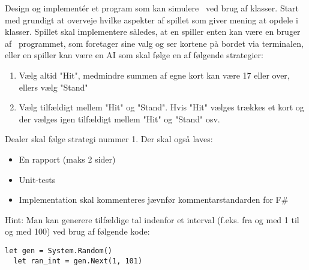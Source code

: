 Design og implement\'{e}r et program som kan simulere \sbl\ ved brug af klasser.  Start med grundigt at overveje hvilke aspekter af spillet som giver mening at opdele i klasser. Spillet skal implementere således, at en spiller enten kan være en bruger af \sbl\ programmet, som foretager sine valg og ser kortene på bordet via terminalen, eller en spiller kan være en AI som skal følge en af følgende strategier:
\begin{enumerate}
\item Vælg altid "Hit", medmindre summen af egne kort kan være 17 eller over, ellers vælg "Stand"
\item Vælg tilfældigt mellem "Hit" og "Stand". Hvis "Hit" vælges trækkes et kort og der vælges igen tilfældigt mellem "Hit" og "Stand" osv.
\end{enumerate}
Dealer skal følge strategi nummer 1.  Der skal også laves:
\begin{itemize}
\item En rapport (maks 2 sider)
\item Unit-tests
\item Implementation skal kommenteres jævnfør kommentarstandarden for F\#
\end{itemize}
Hint: Man kan generere tilfældige tal indenfor et interval (f.eks. fra og med 1 til og med 100) ved brug af følgende kode:
\begin{lstlisting}[frame=none]
  let gen = System.Random()
  let ran_int = gen.Next(1, 101)
\end{lstlisting}
